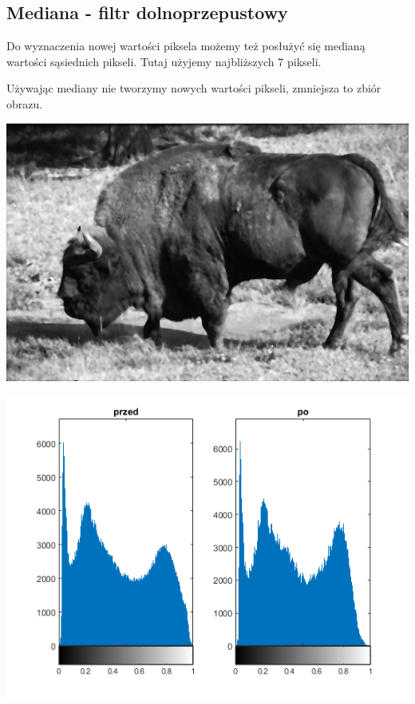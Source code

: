 \documentclass{article}
\begin{document}
	\subsection{Mediana - filtr dolnoprzepustowy}
	Do wyznaczenia nowej wartości piksela możemy też posłużyć się medianą wartości sąsiednich pikseli. Tutaj użyjemy najbliższych 7 pikseli.
	
	Używając mediany nie tworzymy nowych wartości pikseli, zmniejsza to zbiór obrazu.
	
	\begin{center}
		\includegraphics[width=\linewidth]{../../lab03/bison_med.png}
		\label{fig:bison_med}
	\end{center}
	\begin{center}
		\includegraphics[width=\linewidth]{../../lab03/bison_hist.png}
		\label{fig:bison_hist}
	\end{center}
	
\end{document}

